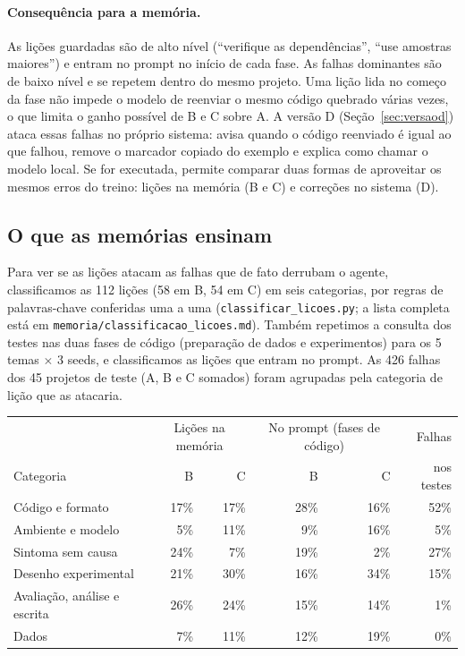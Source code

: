 \documentclass[11pt,a4paper]{article}
\begin{document}
\paragraph{Consequência para a memória.} As lições guardadas são de alto nível (``verifique as
dependências'', ``use amostras maiores'') e entram no prompt no início de cada fase. As falhas
dominantes são de baixo nível e se repetem dentro do mesmo projeto. Uma lição lida no começo da
fase não impede o modelo de reenviar o mesmo código quebrado várias vezes, o que limita o ganho
possível de B e C sobre A. A versão D (Seção~\ref{sec:versaod}) ataca essas falhas no próprio
sistema: avisa quando o código reenviado é igual ao que falhou, remove o marcador copiado do
exemplo e explica como chamar o modelo local. Se for executada, permite comparar duas formas de
aproveitar os mesmos erros do treino: lições na memória (B e C) e correções no sistema (D).

\subsection{O que as memórias ensinam}
\label{sec:licoes}

Para ver se as lições atacam as falhas que de fato derrubam o agente, classificamos as 112 lições
(58 em B, 54 em C) em seis categorias, por regras de palavras-chave conferidas uma a uma
(\texttt{classificar\_licoes.py}; a lista completa está em
\texttt{memoria/classificacao\_licoes.md}). Também repetimos a consulta dos testes nas duas fases
de código (preparação de dados e experimentos) para os 5 temas $\times$ 3 seeds, e classificamos
as lições que entram no prompt. As 426 falhas dos 45 projetos de teste (A, B e C somados) foram
agrupadas pela categoria de lição que as atacaria.

\begin{center}
\small
\begin{tabular}{lrrrrr}
\toprule
 & \multicolumn{2}{c}{Lições na memória} & \multicolumn{2}{c}{No prompt (fases de código)} & Falhas \\
Categoria & B & C & B & C & nos testes \\
\midrule
Código e formato & 17\% & 17\% & 28\% & 16\% & 52\% \\
Ambiente e modelo & 5\% & 11\% & 9\% & 16\% & 5\% \\
Sintoma sem causa & 24\% & 7\% & 19\% & 2\% & 27\% \\
Desenho experimental & 21\% & 30\% & 16\% & 34\% & 15\% \\
Avaliação, análise e escrita & 26\% & 24\% & 15\% & 14\% & 1\% \\
Dados & 7\% & 11\% & 12\% & 19\% & 0\% \\
\bottomrule
\end{tabular}
\end{center}
\end{document}
